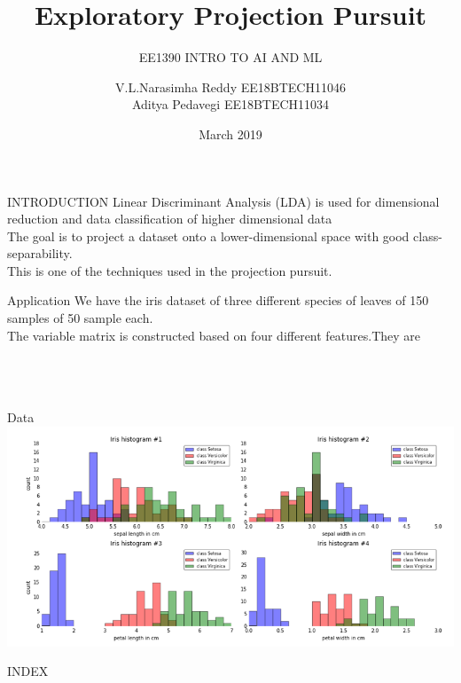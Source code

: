 \documentclass{beamer}
\title{Exploratory Projection Pursuit}
\subtitle{ EE1390 INTRO TO AI AND ML}
\author{V.L.Narasimha Reddy EE18BTECH11046 \\Aditya Pedavegi EE18BTECH11034 }
\date{March 2019}
\begin{document}
\maketitle
\begin{frame}{INTRODUCTION}
Linear Discriminant Analysis (LDA) is  used for dimensional reduction and data classification of higher dimensional data
\\
The goal is to project a dataset onto a lower-dimensional space with good class-separability.
\\
This is one of the techniques used  in the projection pursuit.
\end{frame}
\begin{frame}{Application}
We have the iris dataset of three different species of leaves of 150 samples of 50 sample each.
\\
The variable matrix is constructed based on four different features.They are
\\
\\
\\
\\
\end{frame}
\begin{frame}{Data}
\includegraphics[scale = 0.6]{epp_1.PNG}
    
\end{frame}
\begin{frame}{INDEX}
\\
\\
\\
\\
\\


\end{frame}
\end{document}
